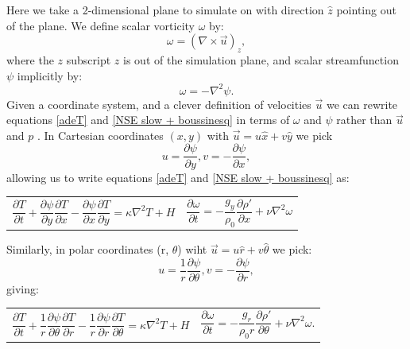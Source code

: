 \documentclass{article}
\begin{document}
Here we take a 2-dimensional plane to simulate on with direction $\hat{z}$ pointing out of the plane. We define scalar vorticity $\omega$ by:
\begin{equation}
	\omega = (\nabla \times \vec{u})_z,
	\label{omega}
\end{equation}
where the $z$ subscript $z$ is out of the simulation plane, and scalar streamfunction $\psi$ implicitly by:
\begin{equation}
	\omega = - \nabla^2 \psi.
	\label{psi}
\end{equation}
Given a coordinate system, and a clever definition of velocities $\vec{u}$ we can rewrite equations \ref{adeT} and \ref{NSE slow + boussinesq} in terms of $\omega$ and $\psi$ rather than $\vec{u}$ and $p$ \cite{tritton2012physical}. In Cartesian coordinates $(x,y)$ with $\vec{u} = u \hat{x} + v \hat{y}$ we pick 
\begin{equation}
	u = \frac{\partial \psi}{\partial y}, v = -\frac{\partial \psi}{\partial x},
	\label{cartesian velocities}
\end{equation}
allowing us to write equations \ref{adeT} and \ref{NSE slow + boussinesq} as:
\begin{tabularx}{\textwidth}{XX}
\begin{equation}
	\frac{\partial T}{\partial t} + \frac{\partial \psi}{\partial y} \frac{\partial T}{\partial x} - \frac{\partial \psi}{\partial x} \frac{\partial T}{\partial y} = \kappa \nabla^2 T + H
	\label{adeT sfvt cartesian}
\end{equation}
    &
\begin{equation}
	\frac{\partial \omega}{\partial t} = -\frac{g_y}{\rho_0} \frac{\partial \rho'}{\partial x} + \nu \nabla^2 \omega
	\label{NSE slow + boussinesq sfvt cartesian}
\end{equation}
\end{tabularx}\par
\noindent Similarly, in polar coordinates (r, $\theta$) wiht $\vec{u} = u \hat{r} + v \hat{\theta}$ we pick:
\begin{equation}
	u = \frac{1}{r} \frac{\partial \psi}{\partial \theta}, v = -\frac{\partial \psi}{\partial r},
	\label{polar velocities}
\end{equation}
giving:
\begin{tabularx}{\textwidth}{XX}
\begin{equation}
	\frac{\partial T}{\partial t} + \frac{1}{r} \frac{\partial \psi}{\partial \theta} \frac{\partial T}{\partial r} - \frac{1}{r} \frac{\partial \psi}{\partial r} \frac{\partial T}{\partial \theta} = \kappa \nabla^2 T + H
	\label{adeT sfvt polar}
\end{equation}
    &
\begin{equation}
	\frac{\partial \omega}{\partial t} = - \frac{g_r}{\rho_0 r} \frac{\partial \rho'}{\partial \theta} +\nu \nabla^2 \omega.
	\label{NSE slow + boussinesq sfvt polar}
\end{equation}
\end{tabularx}\par
\end{document}
